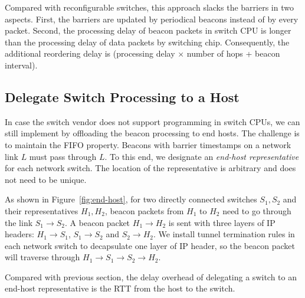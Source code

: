 Compared with reconfigurable switches, this approach slacks the barriers in two aspects.
First, the barriers are updated by periodical beacons instead of by every packet.
Second, the processing delay of beacon packets in switch CPU is longer than the processing delay of data packets by switching chip.
Consequently, the additional reordering delay is (processing delay $\times$ number of hops + beacon interval).

\subsection{Delegate Switch Processing to a Host}
\label{sec:end-host}

In case the switch vendor does not support programming in switch CPUs, we can still implement \sys by offloading the beacon processing to end hosts.
The challenge is to maintain the FIFO property.
Beacons with barrier timestamps on a network link $L$ must pass through $L$.
To this end, we designate an \textit{end-host representative} for each network switch.
The location of the representative is arbitrary and does not need to be unique.

As shown in Figure~\ref{fig:end-host}, for two directly connected switches $S_1, S_2$ and their representatives $H_1, H_2$, beacon packets from $H_1$ to $H_2$ need to go through the link $S_1 \rightarrow S_2$.
A beacon packet $H_1 \rightarrow H_2$ is sent with three layers of IP headers: $H_1 \rightarrow S_1$, $S_1 \rightarrow S_2$ and $S_2 \rightarrow H_2$.
We install tunnel termination rules in each network switch to decapsulate one layer of IP header, so the beacon packet will traverse through $H_1 \rightarrow S_1 \rightarrow S_2 \rightarrow H_2$.

Compared with previous section, the delay overhead of delegating a switch to an end-host representative is the RTT from the host to the switch.
